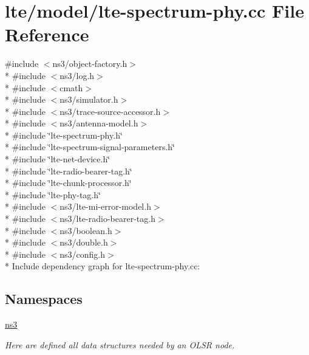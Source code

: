 \hypertarget{lte-spectrum-phy_8cc}{}\section{lte/model/lte-\/spectrum-\/phy.cc File Reference}
\label{lte-spectrum-phy_8cc}
{\ttfamily \#include $<$ns3/object-\/factory.\+h$>$}\\*
{\ttfamily \#include $<$ns3/log.\+h$>$}\\*
{\ttfamily \#include $<$cmath$>$}\\*
{\ttfamily \#include $<$ns3/simulator.\+h$>$}\\*
{\ttfamily \#include $<$ns3/trace-\/source-\/accessor.\+h$>$}\\*
{\ttfamily \#include $<$ns3/antenna-\/model.\+h$>$}\\*
{\ttfamily \#include \char`\"{}lte-\/spectrum-\/phy.\+h\char`\"{}}\\*
{\ttfamily \#include \char`\"{}lte-\/spectrum-\/signal-\/parameters.\+h\char`\"{}}\\*
{\ttfamily \#include \char`\"{}lte-\/net-\/device.\+h\char`\"{}}\\*
{\ttfamily \#include \char`\"{}lte-\/radio-\/bearer-\/tag.\+h\char`\"{}}\\*
{\ttfamily \#include \char`\"{}lte-\/chunk-\/processor.\+h\char`\"{}}\\*
{\ttfamily \#include \char`\"{}lte-\/phy-\/tag.\+h\char`\"{}}\\*
{\ttfamily \#include $<$ns3/lte-\/mi-\/error-\/model.\+h$>$}\\*
{\ttfamily \#include $<$ns3/lte-\/radio-\/bearer-\/tag.\+h$>$}\\*
{\ttfamily \#include $<$ns3/boolean.\+h$>$}\\*
{\ttfamily \#include $<$ns3/double.\+h$>$}\\*
{\ttfamily \#include $<$ns3/config.\+h$>$}\\*
Include dependency graph for lte-\/spectrum-\/phy.cc\+:
\subsection*{Namespaces}
\begin{DoxyCompactItemize}
\item 
 \hyperlink{namespacens3}{ns3}
\begin{DoxyCompactList}\small\item\em Here are defined all data structures needed by an O\+L\+SR node. \end{DoxyCompactList}\end{DoxyCompactItemize}
